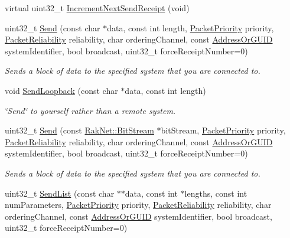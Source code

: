 \begin{DoxyCompactItemize}
\item 
virtual uint32\-\_\-t \hyperlink{class_rak_net_1_1_rak_peer_a9232bd1bc9c1a223ecef8682133f95ac}{Increment\-Next\-Send\-Receipt} (void)
\item 
uint32\-\_\-t \hyperlink{class_rak_net_1_1_rak_peer_a1ee7422f744ab606c92b4ed4b28db40e}{Send} (const char $\ast$data, const int length, \hyperlink{_packet_priority_8h_a659378374e516180f93640c79f59705c}{Packet\-Priority} priority, \hyperlink{_packet_priority_8h_ae41fa01235e99dced384d137fa874a7e}{Packet\-Reliability} reliability, char ordering\-Channel, const \hyperlink{struct_rak_net_1_1_address_or_g_u_i_d}{Address\-Or\-G\-U\-I\-D} system\-Identifier, bool broadcast, uint32\-\_\-t force\-Receipt\-Number=0)
\begin{DoxyCompactList}\small\item\em Sends a block of data to the specified system that you are connected to. \end{DoxyCompactList}\item 
void \hyperlink{class_rak_net_1_1_rak_peer_ac3f1dcedc63156184962aa184ba69ed2}{Send\-Loopback} (const char $\ast$data, const int length)
\begin{DoxyCompactList}\small\item\em \char`\"{}\-Send\char`\"{} to yourself rather than a remote system. \end{DoxyCompactList}\item 
uint32\-\_\-t \hyperlink{class_rak_net_1_1_rak_peer_ac308204d9c3f5f92ac11b30f1d183d4b}{Send} (const \hyperlink{class_rak_net_1_1_bit_stream}{Rak\-Net\-::\-Bit\-Stream} $\ast$bit\-Stream, \hyperlink{_packet_priority_8h_a659378374e516180f93640c79f59705c}{Packet\-Priority} priority, \hyperlink{_packet_priority_8h_ae41fa01235e99dced384d137fa874a7e}{Packet\-Reliability} reliability, char ordering\-Channel, const \hyperlink{struct_rak_net_1_1_address_or_g_u_i_d}{Address\-Or\-G\-U\-I\-D} system\-Identifier, bool broadcast, uint32\-\_\-t force\-Receipt\-Number=0)
\begin{DoxyCompactList}\small\item\em Sends a block of data to the specified system that you are connected to. \end{DoxyCompactList}\item 
uint32\-\_\-t \hyperlink{class_rak_net_1_1_rak_peer_a68a9c6f4db253074f3775d164e39195f}{Send\-List} (const char $\ast$$\ast$data, const int $\ast$lengths, const int num\-Parameters, \hyperlink{_packet_priority_8h_a659378374e516180f93640c79f59705c}{Packet\-Priority} priority, \hyperlink{_packet_priority_8h_ae41fa01235e99dced384d137fa874a7e}{Packet\-Reliability} reliability, char ordering\-Channel, const \hyperlink{struct_rak_net_1_1_address_or_g_u_i_d}{Address\-Or\-G\-U\-I\-D} system\-Identifier, bool broadcast, uint32\-\_\-t force\-Receipt\-Number=0)
$$
\end{DoxyCompactItemize}
